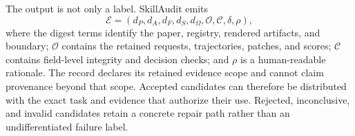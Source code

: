 The output is not only a label. SkillAudit emits
\begin{equation}
\mathcal{E}=(d_P,d_A,d_F,d_S,d_{\Omega},\mathcal{O},\mathcal{C},\delta,\rho),
\label{eq:evidence}
\end{equation}
where the digest terms identify the paper, registry, rendered artifacts, and boundary; $\mathcal{O}$ contains the retained requests, trajectories, patches, and scores; $\mathcal{C}$ contains field-level integrity and decision checks; and $\rho$ is a human-readable rationale. The record declares its retained evidence scope and cannot claim provenance beyond that scope. Accepted candidates can therefore be distributed with the exact task and evidence that authorize their use. Rejected, inconclusive, and invalid candidates retain a concrete repair path rather than an undifferentiated failure label.
